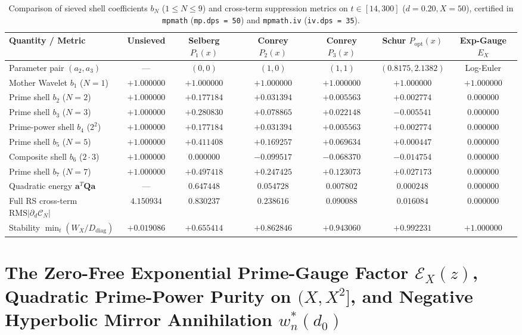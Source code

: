 \documentclass[11pt,reqno]{amsart}
\theoremstyle{definition}
\theoremstyle{remark}
\numberwithin{equation}{section}
\begin{document}
\begin{table}[t]
\centering
\caption{Comparison of sieved shell coefficients $b_N$ ($1 \le N \le 9$) and cross-term suppression metrics on $t \in [14, 300]$ ($d = 0.20, X = 50$), certified in \texttt{mpmath} (\texttt{mp.dps = 50}) and \texttt{mpmath.iv} (\texttt{iv.dps = 35}).}\label{tab:schur_optimization}
\scriptsize
\setlength{\tabcolsep}{3.6pt}
\begin{tabular}{@{}lcccccc@{}}
\toprule
Quantity / Metric & Unsieved & Selberg $P_1(x)$ & Conrey $P_2(x)$ & Conrey $P_3(x)$ & Schur $P_{\mathrm{opt}}(x)$ & Exp-Gauge $E_X$ \\
\midrule
Parameter pair $(a_2, a_3)$ & --- & $(0, 0)$ & $(1, 0)$ & $(1, 1)$ & $(0.8175, 2.1382)$ & Log-Euler \\
Mother Wavelet $b_1$ ($N=1$) & $+1.000000$ & $+1.000000$ & $+1.000000$ & $+1.000000$ & $+1.000000$ & $+1.000000$ \\
Prime shell $b_2$ ($N=2$) & $+1.000000$ & $+0.177184$ & $+0.031394$ & $+0.005563$ & $+0.002774$ & $0.000000$ \\
Prime shell $b_3$ ($N=3$) & $+1.000000$ & $+0.280830$ & $+0.078865$ & $+0.022148$ & $-0.005541$ & $0.000000$ \\
Prime-power shell $b_4$ ($2^2$) & $+1.000000$ & $+0.177184$ & $+0.031394$ & $+0.005563$ & $+0.002774$ & $0.000000$ \\
Prime shell $b_5$ ($N=5$) & $+1.000000$ & $+0.411408$ & $+0.169257$ & $+0.069634$ & $+0.000447$ & $0.000000$ \\
Composite shell $b_6$ ($2\cdot 3$) & $+1.000000$ & $0.000000$ & $-0.099517$ & $-0.068370$ & $-0.014754$ & $0.000000$ \\
Prime shell $b_7$ ($N=7$) & $+1.000000$ & $+0.497418$ & $+0.247425$ & $+0.123073$ & $+0.027173$ & $0.000000$ \\
Quadratic energy $\mathbf{a}^T\mathbf{Q}\mathbf{a}$ & --- & $0.647448$ & $0.054728$ & $0.007802$ & $0.000248$ & $0.000000$ \\
Full RS cross-term $\mathrm{RMS}|\partial_d\mathcal{C}_N|$ & $4.150934$ & $0.830237$ & $0.238616$ & $0.090088$ & $0.016084$ & $0.000000$ \\
Stability $\min_t(W_X/D_{\mathrm{diag}})$ & $+0.019086$ & $+0.655414$ & $+0.862846$ & $+0.943060$ & $+0.992231$ & $+1.000000$ \\
\bottomrule
\end{tabular}
\end{table}

\section{The Zero-Free Exponential Prime-Gauge Factor $\mathcal{E}_X(z)$, Quadratic Prime-Power Purity on $(X, X^2]$, and Negative Hyperbolic Mirror Annihilation $w_n^*(d_0)$}\label{sec:prime_gauge}
\end{document}

